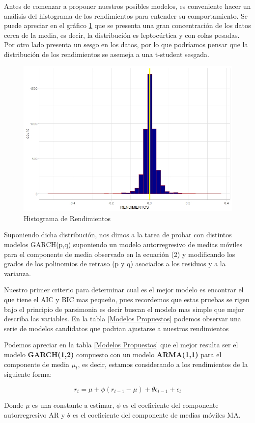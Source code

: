 Antes de comenzar a proponer nuestros posibles modelos, es conveniente hacer un análisis del histograma de los rendimientos para entender su comportamiento. Se puede apreciar en el gráfico \ref{Histograma de Rendimientos} que se presenta una gran concentración de los datos cerca de la media, es decir, la distribución es leptocúrtica y con colas pesadas. Por otro lado presenta un sesgo en los datos, por lo que podríamos pensar que la distribución de los rendimientos se asemeja a una t-student sesgada.
\begin{figure}[ht]
    \centering
    \includegraphics[scale=.5]{Graficos/HistogramaRend.jpeg}
    \caption{Histograma de Rendimientos}
    \label{Histograma de Rendimientos}
\end{figure}

\newpage

Suponiendo dicha distribución, nos dimos a la tarea de probar con distintos modelos GARCH(p,q) suponiendo un modelo autorregresivo de medias móviles para el componente de media observado en la ecuación (2) y modificando los grados de los polinomios de retraso (p y q) asociados a los residuos y a la varianza. 
\bigskip
\smallskip

Nuestro primer criterio para determinar cual es el mejor modelo es encontrar el que tiene el AIC y BIC mas pequeño, pues recordemos que estas pruebas se rigen bajo el principio de parsimonia es decir buscan el modelo mas simple que mejor describa las variables.
\bigskip
En la tabla  \ref{Modelos Propuestos} podemos observar una serie de modelos candidatos que podrian ajustarse a nuestros rendimientos


Podemos apreciar en la tabla \ref{Modelos Propuestos} que el mejor resulta ser el modelo \textbf{GARCH(1,2)} compuesto con un modelo \textbf{ARMA(1,1)} para el componente de media $\mu_t$, es decir, estamos considerando a los rendimientos de la siguiente forma:

 \begin{equation}
   r_t =  \mu + \phi(r_{t-1} - \mu) + \theta \epsilon_{t-1} +  \epsilon_t
\end{equation}

Donde $\mu$ es una constante a estimar, $\phi$ es el coeficiente del componente autorregresivo AR y $\theta$ es el coeficiente del componente de medias móviles MA.


